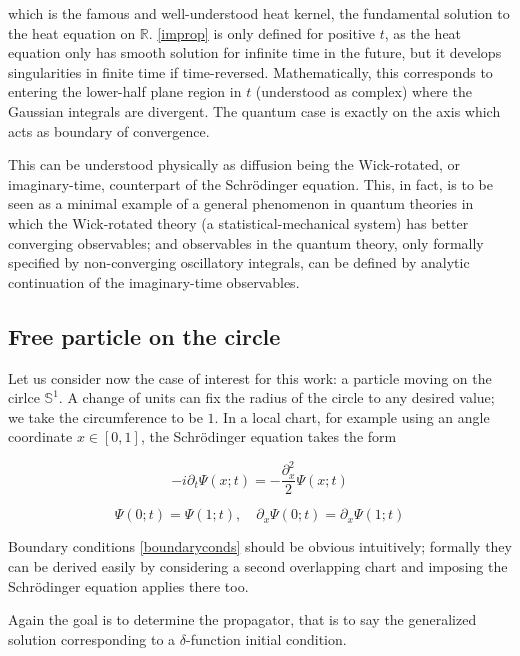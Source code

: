 \documentclass{article}
\newcommand{\ess}{\ensuremath{\mathbb{S}}}
\newcommand{\ar}{\ensuremath{\mathbb{R}}}
\begin{document}
which is the famous and well-understood heat kernel, the fundamental solution to the heat equation on $\ar$. \eqref{improp} is only defined for positive $t$, as the heat equation only has smooth solution for infinite time in the future, but it develops singularities in finite time if time-reversed. Mathematically, this corresponds to entering the lower-half plane region in $t$ (understood as complex) where the Gaussian integrals are divergent. The quantum case is exactly on the axis which acts as boundary of convergence.

This can be understood physically as diffusion being the Wick-rotated, or imaginary-time, counterpart of the Schr\"odinger equation. This, in fact, is to be seen as a minimal example of a general phenomenon in quantum theories in which the Wick-rotated theory (a statistical-mechanical system) has better converging observables; and observables in the quantum theory, only formally specified by non-converging oscillatory integrals, can be defined by analytic continuation of the imaginary-time observables.



\subsection{Free particle on the circle}

Let us consider now the case of interest for this work: a particle moving on the cirlce $\ess^1$. A change of units can fix the radius of the circle to any desired value; we take the circumference to be $1$. In a local chart, for example using an angle coordinate $x \in [0,1]$, the Schr\"odinger equation takes the form

\begin{equation}
    -i\partial_t \Psi(x;t) = - \frac{\partial_x^2}{2} \Psi(x;t)
\end{equation}

\begin{equation}    
    \label{boundaryconds}
    \Psi(0;t) = \Psi(1;t), \quad \partial_x \Psi(0;t) = \partial_x \Psi(1;t)
\end{equation}

Boundary conditions \eqref{boundaryconds} should be obvious intuitively; formally they can be derived easily by considering a second overlapping chart and imposing the Schr\"odinger equation applies there too.

Again the goal is to determine the propagator, that is to say the generalized solution corresponding to a $\delta$-function initial condition.
\end{document}
